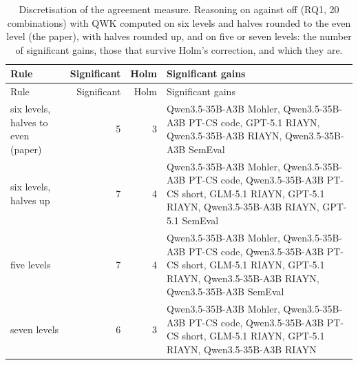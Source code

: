 \documentclass[10pt]{article}
\begin{document}
\begingroup\footnotesize
\begin{longtable}{>{\raggedright\arraybackslash}p{3.6cm}rr>{\raggedright\arraybackslash}p{8.4cm}}
\caption{Discretisation of the agreement measure. Reasoning on against off (RQ1, 20 combinations) with QWK computed on six levels and halves rounded to the even level (the paper), with halves rounded up, and on five or seven levels: the number of significant gains, those that survive Holm's correction, and which they are.}\\
\hline
Rule & Significant & Holm & Significant gains \\ \hline
\endfirsthead
\hline
Rule & Significant & Holm & Significant gains \\ \hline
\endhead
six levels, halves to even (paper) & 5 & 3 & Qwen3.5-35B-A3B Mohler, Qwen3.5-35B-A3B PT-CS code, GPT-5.1 RIAYN, Qwen3.5-35B-A3B RIAYN, Qwen3.5-35B-A3B SemEval \\
six levels, halves up & 7 & 4 & Qwen3.5-35B-A3B Mohler, Qwen3.5-35B-A3B PT-CS code, Qwen3.5-35B-A3B PT-CS short, GLM-5.1 RIAYN, GPT-5.1 RIAYN, Qwen3.5-35B-A3B RIAYN, GPT-5.1 SemEval \\
five levels & 7 & 4 & Qwen3.5-35B-A3B Mohler, Qwen3.5-35B-A3B PT-CS code, Qwen3.5-35B-A3B PT-CS short, GLM-5.1 RIAYN, GPT-5.1 RIAYN, Qwen3.5-35B-A3B RIAYN, Qwen3.5-35B-A3B SemEval \\
seven levels & 6 & 3 & Qwen3.5-35B-A3B Mohler, Qwen3.5-35B-A3B PT-CS code, Qwen3.5-35B-A3B PT-CS short, GLM-5.1 RIAYN, GPT-5.1 RIAYN, Qwen3.5-35B-A3B RIAYN \\
\hline
\end{longtable}
\endgroup
\end{document}
